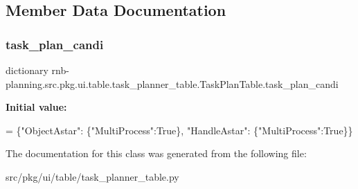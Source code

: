 \subsection{Member Data Documentation}
\mbox{\label{classrnb-planning_1_1src_1_1pkg_1_1ui_1_1table_1_1task__planner__table_1_1_task_plan_table_af05cca21d2a29f3092d43335409db751}} 
\subsubsection{\texorpdfstring{task\+\_\+plan\+\_\+candi}{task\_plan\_candi}}
{\footnotesize\ttfamily dictionary rnb-\/planning.\+src.\+pkg.\+ui.\+table.\+task\+\_\+planner\+\_\+table.\+Task\+Plan\+Table.\+task\+\_\+plan\+\_\+candi\hspace{0.3cm}{\ttfamily [static]}}

{\bfseries Initial value\+:}
\begin{DoxyCode}
=  \{\textcolor{stringliteral}{"ObjectAstar"}: \{\textcolor{stringliteral}{"MultiProcess"}:\textcolor{keyword}{True}\},
                       \textcolor{stringliteral}{"HandleAstar"}: \{\textcolor{stringliteral}{"MultiProcess"}:\textcolor{keyword}{True}\}\}
\end{DoxyCode}


The documentation for this class was generated from the following file\+:\begin{DoxyCompactItemize}
\item 
src/pkg/ui/table/task\+\_\+planner\+\_\+table.\+py\end{DoxyCompactItemize}
